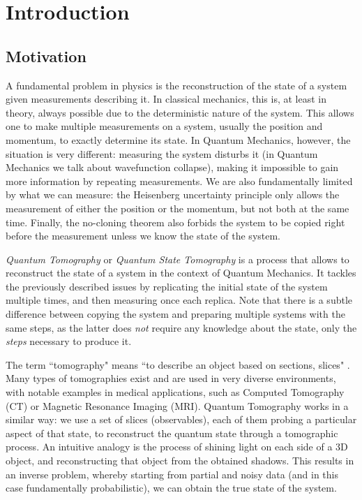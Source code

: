 \documentclass[12pt]{memoir}
\begin{document}
\chapter{Introduction}

\section{Motivation}
A fundamental problem in physics is the reconstruction of the state of a system given measurements describing it. In classical mechanics, this is, at least in theory, always possible due to the deterministic nature of the system. This allows one to make multiple measurements on a system, usually the position and momentum, to exactly determine its state. In Quantum Mechanics, however, the situation is very different: measuring the system disturbs it (in Quantum Mechanics we talk about wavefunction collapse), making it impossible to gain more information by repeating measurements. We are also fundamentally limited by what we can measure: the Heisenberg uncertainty principle only allows the measurement of either the position or the momentum, but not both at the same time. Finally, the no-cloning theorem also forbids the system to be copied right before the measurement unless we know the state of the system.\medbreak

\textit{Quantum Tomography} or \textit{Quantum State Tomography} is a process that allows to reconstruct the state of a system in the context of Quantum Mechanics. It tackles the previously described issues by replicating the initial state of the system multiple times, and then measuring once each replica. Note that there is a subtle difference between copying the system and preparing multiple systems with the same steps, as the latter does \textit{not} require any knowledge about the state, only the \textit{steps} necessary to produce it.\medbreak

The term ``tomography" means ``to describe an object based on sections, slices" \cite{wiki:tomography}. Many types of tomographies exist and are used in very diverse environments, with notable examples in medical applications, such as Computed Tomography (CT) or Magnetic Resonance Imaging (MRI). Quantum Tomography works in a similar way: we use a set of slices (observables), each of them probing a particular aspect of that state, to reconstruct the quantum state through a tomographic process. An intuitive analogy is the process of shining light on each side of a 3D object, and reconstructing that object from the obtained shadows. This results in an inverse problem, whereby starting from partial and noisy data (and in this case fundamentally probabilistic), we can obtain the true state of the system.
\end{document}
